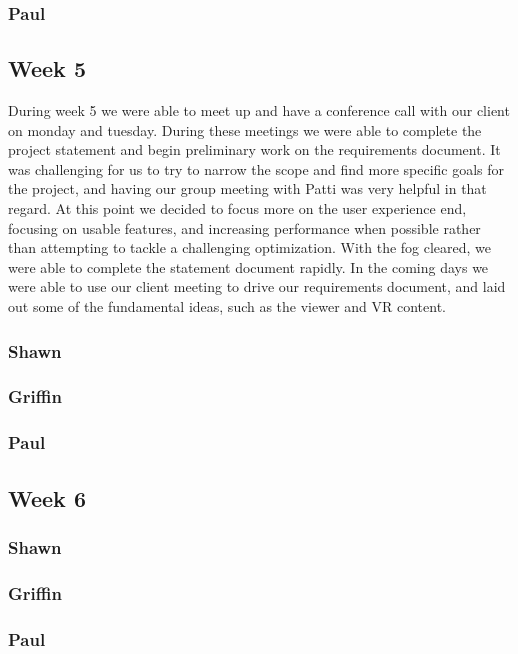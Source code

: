 \documentclass[10pt,draftclsnofoot,onecolumn]{IEEEtran}
\begin{document}
\subsubsection{Paul}

\subsection{Week 5}
During week 5 we were able to meet up and have a conference call with our client on monday and tuesday. During these meetings we were able to complete the project statement and begin preliminary work on the requirements document. It was challenging for us to try to narrow the scope and find more specific goals for the project, and having our group meeting with Patti was very helpful in that regard. At this point we decided to focus more on the user experience end, focusing on usable features, and increasing performance when possible rather than attempting to tackle a challenging optimization. With the fog cleared, we were able to complete the statement document rapidly. In the coming days we were able to use our client meeting to drive our requirements document, and laid out some of the fundamental ideas, such as the viewer and VR content.
\subsubsection{Shawn}
\subsubsection{Griffin}
\subsubsection{Paul}

\subsection{Week 6}
\subsubsection{Shawn}
\subsubsection{Griffin}
\subsubsection{Paul}
\end{document}
